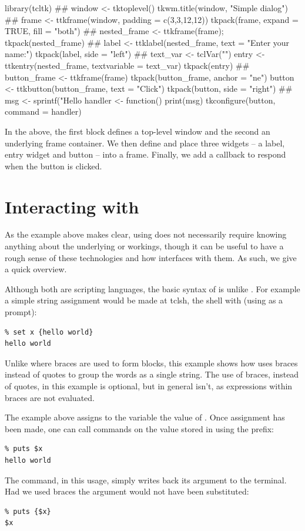 \begin{Schunk}
\begin{Sinput}
 library(tcltk)
 ##
 window <- tktoplevel()
 tkwm.title(window, "Simple dialog")
 ##
 frame <- ttkframe(window, padding = c(3,3,12,12))
 tkpack(frame, expand = TRUE, fill = "both")
 ##
 nested_frame <- ttkframe(frame); tkpack(nested_frame)
 ##
 label <- ttklabel(nested_frame, text = "Enter your name:")
 tkpack(label, side = "left")
 ##
 text_var <- tclVar("")
 entry <- ttkentry(nested_frame, textvariable = text_var)
 tkpack(entry)
 ##
 button_frame <- ttkframe(frame)
 tkpack(button_frame, anchor = "ne")
 button <- ttkbutton(button_frame, text = "Click")
 tkpack(button, side = "right")
 ##
 msg <- sprintf("Hello %
 handler <- function() print(msg)
 tkconfigure(button, command = handler)
\end{Sinput}
\end{Schunk}
In the above, the first block defines a top-level window and the
second an underlying frame container. We then define and place three
widgets -- a label, entry widget and button -- into a frame. Finally,
we add a callback to respond when the button is clicked.


\section{Interacting with \TCL}
\label{sec:tcltk:interacting-with-tcl}

As the example above makes clear, using  does not
necessarily require knowing anything about the underlying \Tk{} or
\Tcl{} workings, though it can be useful to have a rough sense of these
technologies and how  interfaces with them. As such, we
give a quick overview.


Although both are scripting languages, the basic syntax of \TCL\/ is
unlike \R. For example a simple string assignment would be made at
tclsh, the \TCL\/ shell with (using \code{\%} as a prompt):
\begin{verbatim}
% set x {hello world}
hello world
\end{verbatim}
Unlike \R\/ where braces are used to form blocks, this example shows
how \TCL\/ uses braces instead of quotes to group the words as a
single string. The use of braces, instead of quotes, in this example
is optional, but in general isn't, as expressions within braces are
not evaluated.  

The example above assigns to the variable  the
value of . Once assignment has been made, one can
call commands on the value stored in  using the \code{\$}
prefix:
\begin{verbatim}
% puts $x
hello world
\end{verbatim}
The  command, in this usage, simply writes back its argument to the terminal. Had
we used braces the argument would not have been substituted:
\begin{verbatim}
% puts {$x}
$x
\end{verbatim}

